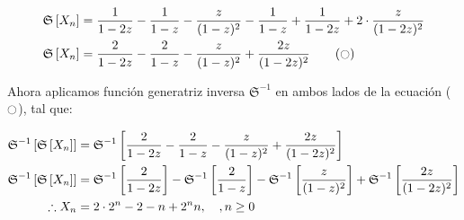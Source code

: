 \begin{align*}
    \mathfrak{S}\left[ X_n \right] &= \frac{1}{1-2z} - \frac{1}{1-z} - \frac{z}{(1-z)^2} -\frac{1}{1-z} + \frac{1}{1-2z} + 2\cdot \frac{z}{(1-2z)^2} \\ 
    \mathfrak{S}\left[ X_n \right] &= \frac{2}{1-2z} - \frac{2}{1-z} - \frac{z}{(1-z)^2} + \frac{2z}{(1-2z)^2} \tag{$\fullmoon$}
\end{align*}

Ahora aplicamos función generatriz inversa $\mathfrak{S}^{-1}$ en ambos lados de la ecuación ($\fullmoon$), tal que:

\begin{align*}
    \mathfrak{S}^{-1}\left[ \mathfrak{S}\left[ X_n \right] \right] &= \mathfrak{S}^{-1}\left[ \frac{2}{1-2z} - \frac{2}{1-z} - \frac{z}{(1-z)^2} + \frac{2z}{(1-2z)^2} \right]\\
    \mathfrak{S}^{-1}\left[ \mathfrak{S}\left[ X_n \right] \right] &= \mathfrak{S}^{-1}\left[ \frac{2}{1-2z} \right] - \mathfrak{S}^{-1}\left[ \frac{2}{1-z} \right] - \mathfrak{S}^{-1}\left[ \frac{z}{(1-z)^2} \right] + \mathfrak{S}^{-1}\left[ \frac{2z}{(1-2z)^2} \right]\\
    \therefore X_n &= 2\cdot2^n - 2 - n + 2^nn, \quad , n\ge0
\end{align*}